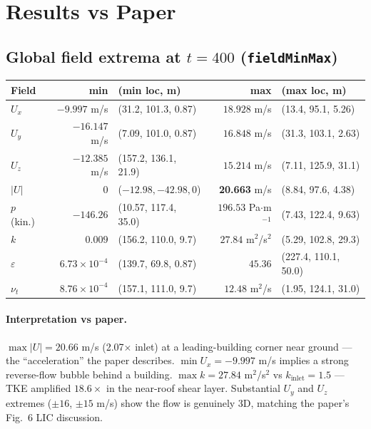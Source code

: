 \documentclass[11pt,a4paper]{article}
\begin{document}
\section{Results vs Paper}

\subsection{Global field extrema at $t=400$ (\texttt{fieldMinMax})}
{\small
\begin{center}
\begin{tabular}{@{}lrlrl@{}}
\toprule
Field & min & (min loc, m) & max & (max loc, m) \\
\midrule
$U_x$ & $-9.997$ m/s & (31.2, 101.3, 0.87) & $18.928$ m/s & (13.4, 95.1, 5.26) \\
$U_y$ & $-16.147$ m/s & (7.09, 101.0, 0.87) & $16.848$ m/s & (31.3, 103.1, 2.63) \\
$U_z$ & $-12.385$ m/s & (157.2, 136.1, 21.9) & $15.214$ m/s & (7.11, 125.9, 31.1) \\
$|U|$ & $0$ & ($-12.98,-42.98,0$) & \textbf{20.663} m/s & (8.84, 97.6, 4.38) \\
$p$ (kin.) & $-146.26$ & (10.57, 117.4, 35.0) & $196.53$ Pa$\cdot$m$^{-1}$ & (7.43, 122.4, 9.63) \\
$k$ & $0.009$ & (156.2, 110.0, 9.7) & $27.84$ m$^2$/s$^2$ & (5.29, 102.8, 29.3) \\
$\varepsilon$ & $6.73{\times}10^{-4}$ & (139.7, 69.8, 0.87) & $45.36$ & (227.4, 110.1, 50.0) \\
$\nu_t$ & $8.76{\times}10^{-4}$ & (157.1, 111.0, 9.7) & $12.48$ m$^2$/s & (1.95, 124.1, 31.0) \\
\bottomrule
\end{tabular}
\end{center}
}

\paragraph{Interpretation vs paper.}
$\max|U|=20.66$ m/s (2.07$\times$ inlet) at a leading-building corner near
ground --- the ``acceleration'' the paper describes.
$\min U_x=-9.997$ m/s implies a strong reverse-flow bubble behind a building.
$\max k = 27.84$ m$^2$/s$^2$ vs $k_\text{inlet}=1.5$ --- TKE amplified
$18.6\times$ in the near-roof shear layer.
Substantial $U_y$ and $U_z$ extremes ($\pm 16$, $\pm 15$ m/s) show the flow
is genuinely 3D, matching the paper's Fig.~6 LIC discussion.
\end{document}
